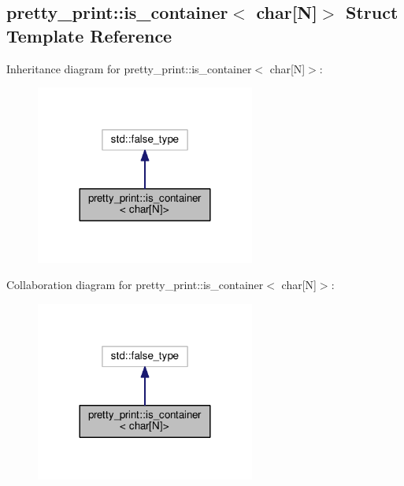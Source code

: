 \hypertarget{structpretty__print_1_1is__container_3_01char[N]_4}{}\subsection{pretty\+\_\+print\+:\+:is\+\_\+container$<$ char\mbox{[}N\mbox{]}$>$ Struct Template Reference}
\label{structpretty__print_1_1is__container_3_01char[N]_4}


Inheritance diagram for pretty\+\_\+print\+:\+:is\+\_\+container$<$ char\mbox{[}N\mbox{]}$>$\+:\nopagebreak
\begin{figure}[H]
\begin{center}
\leavevmode
\includegraphics[width=204pt]{structpretty__print_1_1is__container_3_01char[N]_4__inherit__graph}
\end{center}
\end{figure}


Collaboration diagram for pretty\+\_\+print\+:\+:is\+\_\+container$<$ char\mbox{[}N\mbox{]}$>$\+:\nopagebreak
\begin{figure}[H]
\begin{center}
\leavevmode
\includegraphics[width=204pt]{structpretty__print_1_1is__container_3_01char[N]_4__coll__graph}
\end{center}
\end{figure}



